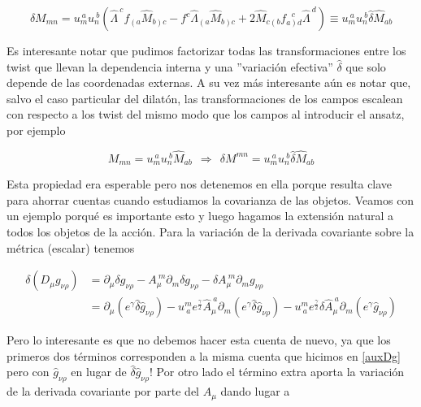 \documentclass{article}
\numberwithin{equation}{section}
\begin{document}
\begin{boxeq}
	\begin{equation}\label{hatbtransformation}
	\delta M_{m n} = u_{m}^{ \ a} u_{n}^{ \ b} \left( \hat{\Lambda}^{\ c} f_{\left( a \right.}\hat{M}_{\left. b\right) c} - f^c \hat{\Lambda}_{\left( a\right.} \hat{M}_{\left. b\right) c} + 2 \hat{M}_{c \left( b\right.}f_{\left. a\right) d}^{\ \ \  c} \hat{\Lambda}^{\ d}  \right) \equiv  u_{m}^{ \ a} u_{n}^{ \ b} \hat{\delta} \hat{M}_{a b}
	\end{equation}
\end{boxeq}


Es interesante notar que pudimos factorizar todas las transformaciones entre los twist que llevan la dependencia interna y una ''variación efectiva'' $ \hat{\delta} $ que solo depende de las coordenadas externas. A su vez más interesante aún es notar que, salvo el caso particular del dilatón, las transformaciones de los campos escalean con respecto a los twist del mismo modo que los campos al introducir el ansatz, por ejemplo

\begin{equation}
M_{m n} = u_{m}^{ \ a} u_{n}^{ \ b} \hat{M}_{a b} \ \ \Rightarrow \ \ \delta M^{m n} = u_{m}^{ \ a} u_{n}^{ \ b} \hat{\delta} \hat{M}_{a b}
\end{equation}

Esta propiedad era esperable pero nos detenemos en ella porque resulta clave para ahorrar cuentas cuando estudiamos la covarianza de las objetos. Veamos con un ejemplo porqué es importante esto y luego hagamos la extensión natural a todos los objetos de la acción. Para la variación de la derivada covariante sobre la métrica (escalar) tenemos

\begin{equation}
\begin{aligned}
\delta \left( D_{\mu} g_{\nu \rho} \right) &= \partial_{\mu} \delta g_{\nu \rho} - A_{\mu}^{\ m} \partial_m \delta g_{\nu \rho} - \delta A_{\mu}^{\ m} \partial_m g_{\nu \rho}\\
&= \partial_{\mu} \left( e^{\gamma} \hat{\delta} \hat{g}_{\nu \rho} \right) - u^{m}_{\ a} e^{\frac{\gamma}{2}} \hat{A}_{\mu}^{\ a}  \partial_m \left( e^{\gamma} \hat{\delta} \hat{g}_{\nu \rho} \right) - u^{m}_{\ a} e^{\frac{\gamma}{2}} \hat{\delta} \hat{A}_{\mu}^{\ a}  \partial_m \left( e^{\gamma} \hat{g}_{\nu \rho} \right)
\end{aligned}
\end{equation}

Pero lo interesante es que no debemos hacer esta cuenta de nuevo, ya que los primeros dos términos corresponden a la misma cuenta que hicimos en \ref{auxDg} pero con $ \hat{g}_{\nu \rho} $ en lugar de $ \hat{\delta} \hat{g}_{\nu \rho} $! Por otro lado el término extra aporta la variación de la derivada covariante por parte del $ A_{\mu} $ dando lugar a 
\end{document}
